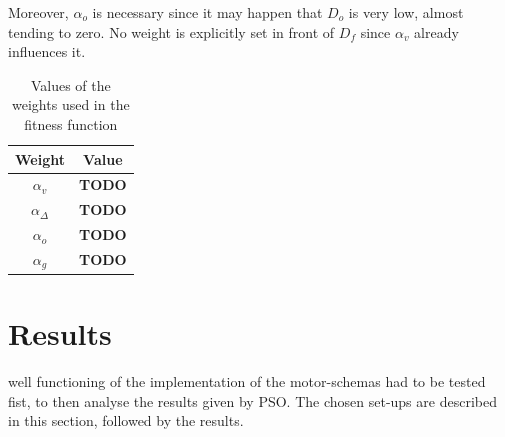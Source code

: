 \documentclass[journal]{IEEEtran}
\begin{document}
Moreover, $\alpha_o$ is necessary since it may happen that $D_o$ is very low, almost tending to zero. No weight is explicitly set in front of $D_f$ since $\alpha_v$ already influences it.
\begin{table}
\begin{center}
\begin{tabular}{|c|c|}
  \hline
  Weight & Value\\
  \hline
  $\alpha_v$ &  \textbf{TODO} \\
  $\alpha_\Delta$ & \textbf{TODO} \\
  $\alpha_o$ & \textbf{TODO} \\
  $\alpha_g$ & \textbf{TODO} \\
  \hline
\end{tabular}
\caption{Values of the weights used in the fitness function} \label{weights_fitfct}
\end{center} 
\end{table}

\section{Results}
\label{sec:4}
 well functioning of the implementation of the motor-schemas had to be tested fist, to then analyse the results given by PSO. The chosen set-ups are described in this section, followed by the results. 
\end{document}
